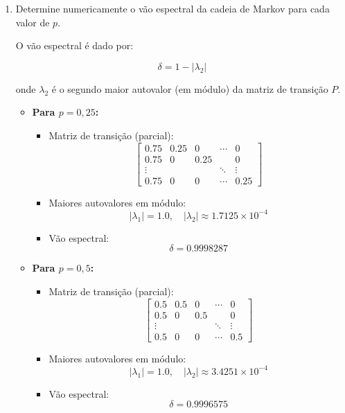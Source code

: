 \begin{enumerate}
\begin{resposta}
    \end{resposta}
    \item Determine numericamente o vão espectral da cadeia de Markov para cada valor de $p$.
    \begin{resposta}

        O vão espectral é dado por:

        $$\delta = 1 - |\lambda_2| $$
        
            onde $\lambda_2$ é o segundo maior autovalor (em módulo) da matriz de transição $P$.

        \newpage
        \begin{itemize}        
            \item \textbf{Para $p = 0{,}25$:}
            \begin{itemize}
                \item Matriz de transição (parcial):
                $$
                \begin{bmatrix}
                0.75 & 0.25 & 0    & \cdots & 0 \\
                0.75 & 0    & 0.25 &        & 0 \\
                \vdots &     &     & \ddots & \vdots \\
                0.75 & 0    & 0    & \cdots & 0.25
                \end{bmatrix}
                $$
                \item Maiores autovalores em módulo:
                $$ |\lambda_1| = 1.0, \quad |\lambda_2| \approx 1.7125 \times 10^{-4} $$
                \item Vão espectral:
                $$ \boxed{\delta = 0.9998287} $$
            \end{itemize}
        
            \item \textbf{Para $p = 0{,}5$:}
            \begin{itemize}
                \item Matriz de transição (parcial):
                $$
                \begin{bmatrix}
                0.5 & 0.5 & 0    & \cdots & 0 \\
                0.5 & 0   & 0.5  &        & 0 \\
                \vdots &     &     & \ddots & \vdots \\
                0.5 & 0   & 0    & \cdots & 0.5
                \end{bmatrix}
                $$
                \item Maiores autovalores em módulo:
                $$ |\lambda_1| = 1.0, \quad |\lambda_2| \approx 3.4251 \times 10^{-4} $$
                \item Vão espectral:
                $$ \boxed{\delta = 0.9996575} $$
            \end{itemize}
        

\end{itemize}
\end{resposta}
\end{enumerate}
